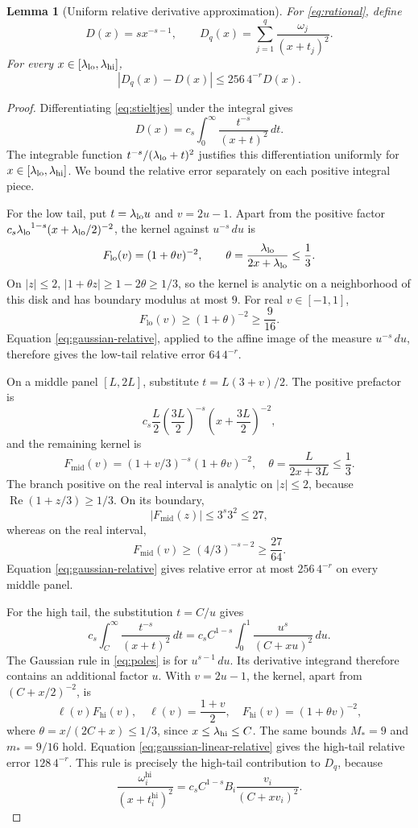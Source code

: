 \documentclass[conference]{IEEEtran}
\newtheorem{lemma}{Lemma}
\theoremstyle{definition}
\begin{document}
\begin{lemma}[Uniform relative derivative approximation]
\label{lem:derivative-quadrature}
For \eqref{eq:rational}, define
\[
D(x)=sx^{-s-1},\qquad D_q(x)=\sum_{j=1}^q\frac{\omega_j}{(x+t_j)^2}.
\]
For every $x\in[\lambda_{\rm lo},\lambda_{\rm hi}]$,
\begin{equation}
|D_q(x)-D(x)|\le256\,4^{-r}D(x).
\label{eq:derivative-relative}
\end{equation}
\end{lemma}
\begin{proof}
Differentiating \eqref{eq:stieltjes} under the integral gives
\begin{equation}
D(x)=c_s\int_0^\infty\frac{t^{-s}}{(x+t)^2}\,dt.
\label{eq:derivative-integral}
\end{equation}
The integrable function $t^{-s}/({\lambda_{\rm lo}}+t)^2$ justifies this differentiation uniformly for $x\in[\lambda_{\rm lo},\lambda_{\rm hi}]$. We bound the relative error separately on each positive integral piece.

For the low tail, put $t={\lambda_{\rm lo}}u$ and $v=2u-1$. Apart from the positive factor $c_s{\lambda_{\rm lo}}^{1-s}(x+{\lambda_{\rm lo}}/2)^{-2}$, the kernel against $u^{-s}\,du$ is
\[
F_{\mathrm{lo}}(v)=(1+\theta v)^{-2},\qquad
\theta=\frac {\lambda_{\rm lo}}{2x+{\lambda_{\rm lo}}}\le\frac13.
\]
On $|z|\le2$, $|1+\theta z|\ge1-2\theta\ge1/3$, so the kernel is analytic on a neighborhood of this disk and has boundary modulus at most $9$. For real $v\in[-1,1]$,
\[
F_{\mathrm{lo}}(v)\ge(1+\theta)^{-2}\ge\frac9{16}.
\]
Equation \eqref{eq:gaussian-relative}, applied to the affine image of the measure $u^{-s}\,du$, therefore gives the low-tail relative error $64\,4^{-r}$.

On a middle panel $[L,2L]$, substitute $t=L(3+v)/2$. The positive prefactor is
\[
c_s\frac L2\left(\frac{3L}{2}\right)^{-s}
\left(x+\frac{3L}{2}\right)^{-2},
\]
and the remaining kernel is
\[
F_{\mathrm{mid}}(v)=(1+v/3)^{-s}(1+\theta v)^{-2},
\quad\theta=\frac L{2x+3L}\le\frac13.
\]
The branch positive on the real interval is analytic on $|z|\le2$, because $\operatorname{Re}(1+z/3)\ge1/3$. On its boundary,
\[
|F_{\mathrm{mid}}(z)|\le3^s3^2\le27,
\]
whereas on the real interval,
\[
F_{\mathrm{mid}}(v)\ge(4/3)^{-s-2}\ge\frac{27}{64}.
\]
Equation \eqref{eq:gaussian-relative} gives relative error at most $256\,4^{-r}$ on every middle panel.

For the high tail, the substitution $t=C/u$ gives
\[
c_s\int_C^\infty\frac{t^{-s}}{(x+t)^2}\,dt
=c_sC^{1-s}\int_0^1\frac{u^s}{(C+xu)^2}\,du.
\]
The Gaussian rule in \eqref{eq:poles} is for $u^{s-1}\,du$. Its derivative integrand therefore contains an additional factor $u$. With $v=2u-1$, the kernel, apart from $(C+x/2)^{-2}$, is
\[
\ell(v)F_{\mathrm{hi}}(v),\quad
\ell(v)=\frac{1+v}{2},\quad
F_{\mathrm{hi}}(v)=(1+\theta v)^{-2},
\]
where $\theta=x/(2C+x)\le1/3$, since $x\le\lambda_{\rm hi}\le C$. The same bounds ${M_*}=9$ and ${m_*}=9/16$ hold. Equation \eqref{eq:gaussian-linear-relative} gives the high-tail relative error $128\,4^{-r}$. This rule is precisely the high-tail contribution to $D_q$, because
\[
\frac{\omega_i^{\mathrm{hi}}}{(x+t_i^{\mathrm{hi}})^2}
=c_sC^{1-s}B_i\frac{v_i}{(C+xv_i)^2}.
\]


\end{proof}
\end{document}
